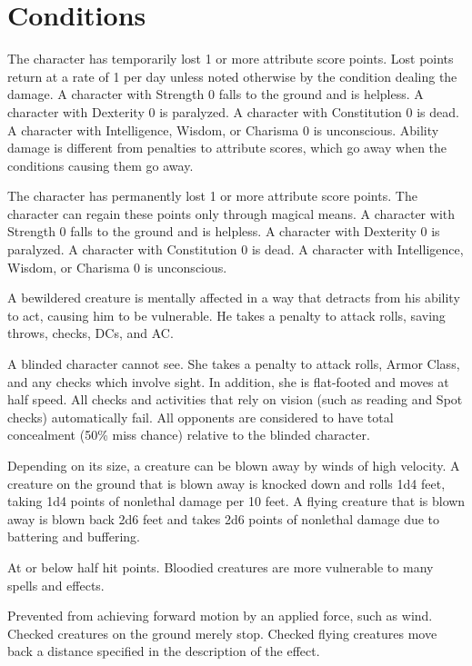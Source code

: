 \appendix
\chapter{Conditions}

 The character has temporarily lost 1 or more attribute score points. Lost points return at a rate of 1 per day unless noted otherwise by the condition dealing the damage. A character with Strength 0 falls to the ground and is helpless. A character with Dexterity 0 is paralyzed. A character with Constitution 0 is dead. A character with Intelligence, Wisdom, or Charisma 0 is unconscious. Ability damage is different from penalties to attribute scores, which go away when the conditions causing them go away.

 The character has permanently lost 1 or more attribute score points. The character can regain these points only through magical means. A character with Strength 0 falls to the ground and is helpless. A character with Dexterity 0 is paralyzed. A character with Constitution 0 is dead. A character with Intelligence, Wisdom, or Charisma 0 is unconscious.

 A bewildered creature is mentally affected in a way that detracts from his ability to act, causing him to be vulnerable. He takes a  penalty to attack rolls, saving throws, checks, DCs, and AC.

 A blinded character cannot see. She takes a  penalty to attack rolls, Armor Class, and any checks which involve sight. In addition, she is flat-footed and moves at half speed. All checks and activities that rely on vision (such as reading and Spot checks) automatically fail. All opponents are considered to have total concealment (50\% miss chance) relative to the blinded character.

 Depending on its size, a creature can be blown away by winds of high velocity. A creature on the ground that is blown away is knocked down and rolls 1d4  feet, taking 1d4 points of nonlethal damage per 10 feet. A flying creature that is blown away is blown back 2d6  feet and takes 2d6 points of nonlethal damage due to battering and buffering.

 At or below half hit points. Bloodied creatures are more vulnerable to many spells and effects.

 Prevented from achieving forward motion by an applied force, such as wind. Checked creatures on the ground merely stop. Checked flying creatures move back a distance specified in the description of the effect.

